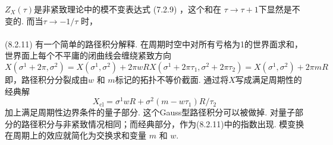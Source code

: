 $Z_{X}(\tau)$是非紧致理论中的模不变表达式 (7.2.9) ，这个和在 $\tau \rightarrow \tau+1$下显然是不变的. 而当$\tau \rightarrow-1 / \tau$ 时，\\

\\

(8.2.11) 有一个简单的路径积分解释. 在周期时空中对所有亏格为1的世界面求和，世界面上每个不平庸的闭曲线会缠绕紧致方向
\begin{subequations}
\begin{equation}
X\left(\sigma^{1}+2 \pi, \sigma^{2}\right) =X\left(\sigma^{1}, \sigma^{2}\right)+2 \pi w R
\end{equation}
\begin{equation}
X\left(\sigma^{1}+2 \pi \tau_{1}, \sigma^{2}+2 \pi \tau_{2}\right) =X\left(\sigma^{1}, \sigma^{2}\right)+2 \pi m R
\end{equation}
\end{subequations}
即，路径积分分裂成由$w$ 和 $m $标记的拓扑不等价截面. 通过将$X$写成满足周期性的经典解                                                                                                              
\begin{equation}
	X_{\mathrm{cl}}=\sigma^{1} w R+\sigma^{2}\left(m-w \tau_{1}\right) R / \tau_{2}
\end{equation}
加上满足周期性边界条件的量子部分. 这个Gauss型路径积分可以被做掉. 对量子部分的路径积分与非紧致情况相同；而经典部分，作为(8.2.11)中的指数出现. 模变换在周期上的效应就简化为交换求和变量 $m$ 和 $w$.\\

